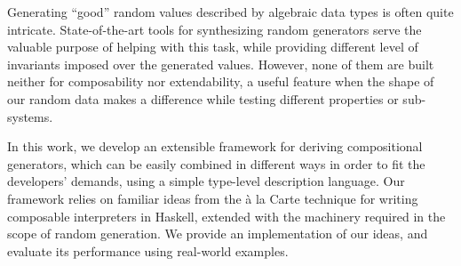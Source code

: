Generating ``good'' random values described by algebraic data types is often
quite intricate.
%
State-of-the-art tools for synthesizing random generators serve the valuable
purpose of helping with this task, while providing different level of invariants
imposed over the generated values.
%
However, none of them are built neither for composability nor extendability, a
useful feature when the shape of our random data makes a difference while
testing different properties or sub-systems.
%


In this work, we develop an extensible framework for deriving compositional
generators, which can be easily combined in different ways in order to fit the
developers' demands, using a simple type-level description language.
%
Our framework relies on familiar ideas from the \`a la Carte technique for
writing composable interpreters in Haskell, extended with the machinery required
in the scope of random generation.
%
We provide an implementation of our ideas, and evaluate its performance using
real-world examples.
